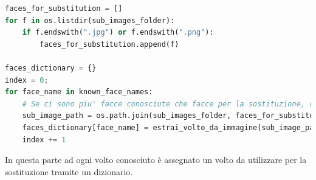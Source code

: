 \documentclass{report}
\begin{document}
\begin{lstlisting}[language=Python, breaklines=true]
faces_for_substitution = []
for f in os.listdir(sub_images_folder):
    if f.endswith(".jpg") or f.endswith(".png"):
        faces_for_substitution.append(f)

faces_dictionary = {}
index = 0;
for face_name in known_face_names:
    # Se ci sono piu' facce conosciute che facce per la sostituzione, riutilizza le immagini partendo da 0
    sub_image_path = os.path.join(sub_images_folder, faces_for_substitution[index % len(faces_for_substitution)])
    faces_dictionary[face_name] = estrai_volto_da_immagine(sub_image_path)
    index += 1
\end{lstlisting}
In questa parte ad ogni volto conosciuto è assegnato un volto da utilizzare per la sostituzione tramite un dizionario.
\end{document}
